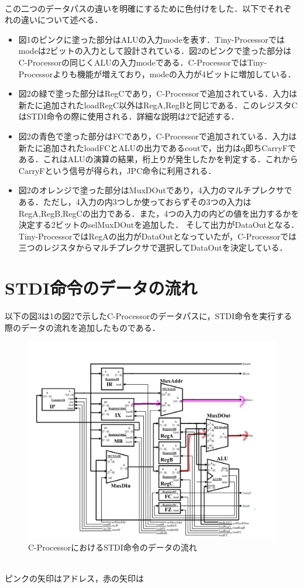 \documentclass[dvipdfmx]{jarticle}
\begin{document}
\\この二つのデータパスの違いを明確にするために色付けをした．以下でそれぞれの違いについて述べる．
\begin{itemize}
  \item 図1のピンクに塗った部分はALUの入力modeを表す．Tiny-Processorではmodeは2ビットの入力として設計されている．図2のピンクで塗った部分は
  C-Processorの同じくALUの入力modeである．C-ProcessorではTiny-Processorよりも機能が増えており，modeの入力が4ビットに増加している．
  \item 図2の緑で塗った部分はRegCであり，C-Processorで追加されている．入力は新たに追加されたloadRegC以外はRegA,RegBと同じである．このレジスタCはSTDI命令の際に使用される．詳細な説明は2で記述する．
  \item 図2の青色で塗った部分はFCであり，C-Processorで追加されている．入力は新たに追加されたloadFCとALUの出力であるcoutで，出力はq即ちCarryFである．これはALUの演算の結果，桁上りが発生したかを判定する．これからCarryFという信号が得られ，JPC命令に利用される．
  \item 図2のオレンジで塗った部分はMuxDOutであり，4入力のマルチプレクサである．ただし，4入力の内3つしか使っておらずその3つの入力はRegA,RegB,RegCの出力である．また，4つの入力の内どの値を出力するかを決定する2ビットのselMuxDOutを追加した．
  そして出力がDataOutとなる．Tiny-ProcessorではRegAの出力がDataOutとなっていたが，C-Processorでは三つのレジスタからマルチプレクサで選択してDataOutを決定している．
\end{itemize}
\clearpage
\section{STDI命令のデータの流れ}
以下の図3は1の図2で示したC-Processorのデータパスに，STDI命令を実行する際のデータの流れを追加したものである．
\begin{figure}[h]
  \centering
  \includegraphics[width = 12cm]{STDI.png}
  \caption{C-ProcessorにおけるSTDI命令のデータの流れ}  
\end{figure}
\\ピンクの矢印はアドレス，赤の矢印は
\end{document}
